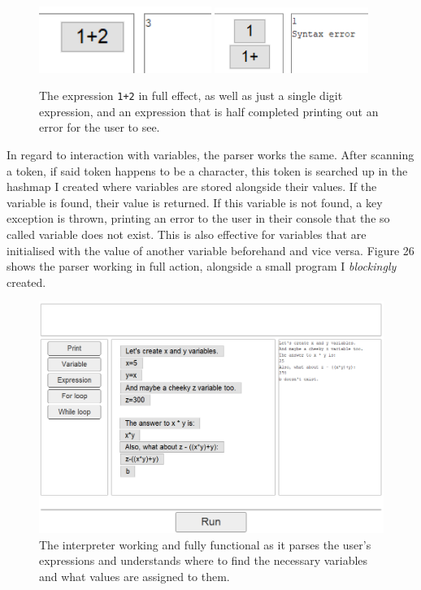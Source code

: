 \documentclass[a4paper, 12pt]{article}
\begin{document}
            \begin{figure}[h]
                \centering
                \includegraphics[width=56mm]{1+2.png}
                \includegraphics[width=50mm]{1+.png}
                \caption{The expression \texttt{1+2} in full effect, as well as just a single digit
                expression, and an expression that is half completed printing out an error for the
                user to see.}
            \end{figure}

            \clearpage
            In regard to interaction with variables, the parser works the same. After scanning a
            token, if said token happens to be a character, this token is searched up in the hashmap
            I created where variables are stored alongside their values. If the variable is found,
            their value is returned. If this variable is not found, a key exception is thrown,
            printing an error to the user in their console that the so called variable does not exist.
            This is also effective for variables that are initialised with the value of another variable
            beforehand and vice versa. Figure 26 shows the parser working in full action, alongside
            a small program I \textit{blockingly} created.

            \begin{figure}[h]
                \centering
                \includegraphics[width=170mm]{working_interpreter.png}
                \caption{The interpreter working and fully functional as it parses the user's
                expressions and understands where to find the necessary variables and
                what values are assigned to them.}
            \end{figure}
\end{document}
